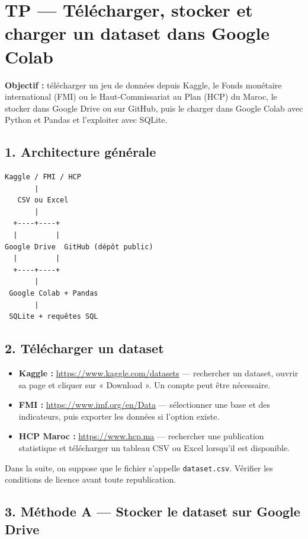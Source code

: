 \documentclass[
]{article}
\author{}
\date{}
\newcommand{\passthrough}[1]{#1}
\providecommand{\tightlist}{%
  \setlength{\itemsep}{0pt}\setlength{\parskip}{0pt}}
\begin{document}
\section{TP --- Télécharger, stocker et charger un dataset dans Google
Colab}\label{tp-tuxe9luxe9charger-stocker-et-charger-un-dataset-dans-google-colab}

\textbf{Objectif :} télécharger un jeu de données depuis Kaggle, le
Fonds monétaire international (FMI) ou le Haut-Commissariat au Plan
(HCP) du Maroc, le stocker dans Google Drive ou sur GitHub, puis le
charger dans Google Colab avec Python et Pandas et l'exploiter avec
SQLite.

\subsection{1. Architecture générale}\label{architecture-guxe9nuxe9rale}

\begin{lstlisting}
Kaggle / FMI / HCP
       |
   CSV ou Excel
       |
  +----+----+
  |         |
Google Drive  GitHub (dépôt public)
  |         |
  +----+----+
       |
 Google Colab + Pandas
       |
 SQLite + requêtes SQL
\end{lstlisting}

\subsection{2. Télécharger un
dataset}\label{tuxe9luxe9charger-un-dataset}

\begin{itemize}
\tightlist
\item
  \textbf{Kaggle :} \url{https://www.kaggle.com/datasets} --- rechercher
  un dataset, ouvrir sa page et cliquer sur « Download ». Un compte peut
  être nécessaire.
\item
  \textbf{FMI :} \url{https://www.imf.org/en/Data} --- sélectionner une
  base et des indicateurs, puis exporter les données si l'option existe.
\item
  \textbf{HCP Maroc :} \url{https://www.hcp.ma} --- rechercher une
  publication statistique et télécharger un tableau CSV ou Excel
  lorsqu'il est disponible.
\end{itemize}

Dans la suite, on suppose que le fichier s'appelle
\passthrough{\lstinline!dataset.csv!}. Vérifier les conditions de
licence avant toute republication.

\subsection{3. Méthode A --- Stocker le dataset sur Google
Drive}\label{muxe9thode-a-stocker-le-dataset-sur-google-drive}
\end{document}

